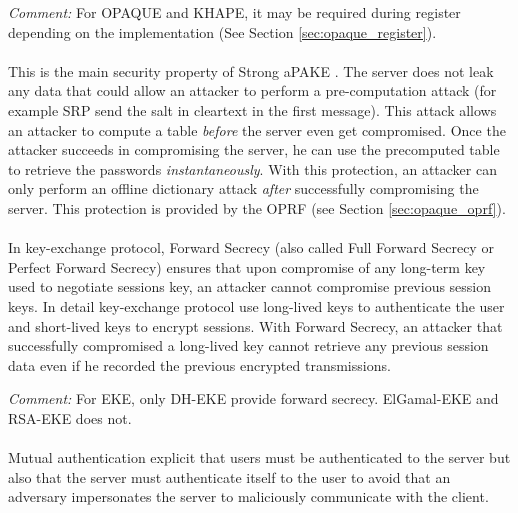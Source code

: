﻿\documentclass[../report.tex]{subfiles}
\begin{document}
\emph{Comment:} For OPAQUE and KHAPE, it may be required during register depending on the implementation (See Section \ref{sec:opaque_register}).


\paragraph{}  \label{sec:secure_against_pca}
This is the main security property of Strong aPAKE \cite{OPAQUE_Paper}. The server does not leak any data that could allow an attacker to perform a pre-computation attack (for example SRP send the salt in cleartext in the first message). This attack allows an attacker to compute a table \emph{before} the server even get compromised. Once the attacker succeeds in compromising the server, he can use the precomputed table to retrieve the passwords \emph{instantaneously}. With this protection, an attacker can only perform an offline dictionary attack \emph{after} successfully compromising the server.
This protection is provided by the OPRF (see Section \ref{sec:opaque_oprf}).


\paragraph{}
In key-exchange protocol, Forward Secrecy (also called Full Forward Secrecy or Perfect Forward Secrecy) ensures that upon compromise of any long-term key used to negotiate sessions key, an attacker cannot compromise previous session keys.
In detail key-exchange protocol use long-lived keys to authenticate the user and short-lived keys to encrypt sessions. With Forward Secrecy, an attacker that successfully compromised a long-lived key cannot retrieve any previous session data even if he recorded the previous encrypted transmissions. %

\emph{Comment:} For EKE, only DH-EKE provide forward secrecy. ElGamal-EKE and RSA-EKE does not.


\paragraph{}
Mutual authentication explicit that users must be authenticated to the server but also that the server must authenticate itself to the user to avoid that an adversary impersonates the server to maliciously communicate with the client.
\end{document}
